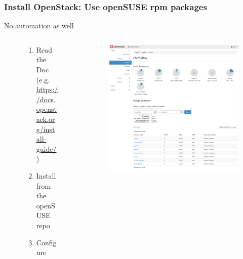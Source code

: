 \documentclass[aspectratio=169,11pt,hyperref={colorlinks=true}]{beamer}
\begin{document}
\begin{frame}
  \frametitle{Install OpenStack: Use openSUSE rpm packages}
  No automation as well
  \begin{columns}[T]
    \begin{column}{0.55\textwidth}
      \begin{figure}
        \begin{enumerate}
        \item Read the Doc (e.g. \url{https://docs.openstack.org/install-guide/})
        \item Install from the openSUSE repo
        \item Configure
        \end{enumerate}
      \end{figure}
    \end{column}
    \begin{column}{0.5\textwidth}
      \begin{figure}
        \includegraphics[width=1.0\textwidth]{openstack-dashboard-instances.png}
      \end{figure}
    \end{column}
  \end{columns}
\end{frame}
\end{document}
